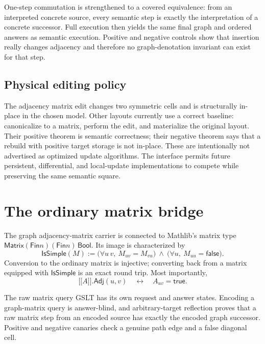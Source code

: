 \documentclass[11pt]{article}
\theoremstyle{remark}
\newcommand{\denote}[1]{\mathopen{[\![}#1\mathclose{]\!]}}
\newcommand{\Fin}{\mathsf{Fin}}
\begin{document}
One-step commutation is strengthened to a covered equivalence: from an
interpreted concrete source, every semantic step is exactly the interpretation
of a concrete successor.  Full execution then yields the same final graph and
ordered answers as semantic execution.  Positive and negative controls show
that insertion really changes adjacency and therefore no graph-denotation
invariant can exist for that step.

\subsection{Physical editing policy}

The adjacency matrix edit changes two symmetric cells and is structurally
in-place in the chosen model.  Other layouts currently use a correct baseline:
canonicalize to a matrix, perform the edit, and materialize the original
layout.  Their positive theorem is semantic correctness; their negative
theorem says that a rebuild with positive target storage is not in-place.
These are intentionally not advertised as optimized update algorithms.  The
interface permits future persistent, differential, and local-update
implementations to compete while preserving the same semantic square.

\section{The ordinary matrix bridge}
\label{sec:matrix}

The graph adjacency-matrix carrier is connected to Mathlib's matrix
type \(\mathsf{Matrix}(\Fin n)(\Fin n)\,\mathsf{Bool}\).  Its image is
characterized by
\[
\mathsf{IsSimple}(M) :=
  \bigl(\forall u\,v,\ M_{uv}=M_{vu}\bigr)\ \wedge\
  \bigl(\forall u,\ M_{uu}=\mathsf{false}\bigr).
\]
Conversion to the ordinary matrix is injective; converting back from a matrix
equipped with \(\mathsf{IsSimple}\) is an exact round trip.  Most importantly,
\[
  \denote{A}.\mathsf{Adj}(u,v)
  \quad\longleftrightarrow\quad A_{uv}=\mathsf{true}.
\]

The raw matrix query GSLT has its own request and answer states.  Encoding a
graph-matrix query is answer-blind, and arbitrary-target reflection proves
that a raw matrix step from an encoded source has exactly the encoded graph
successor.  Positive and negative canaries check a genuine path edge and a
false diagonal cell.
\end{document}
